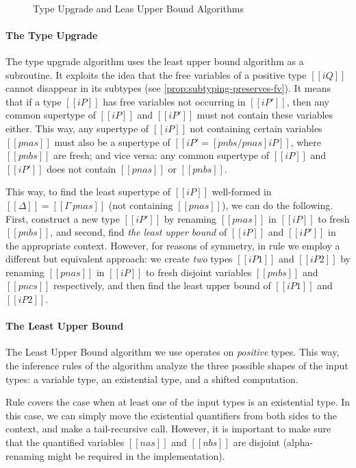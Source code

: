\begin{figure}[t]
  \begin{multicols}{2}
    \ottdefnLUBUpLabeled{}
    \columnbreak\\
    \ottdefnLUBNsubLabeled{}
  \end{multicols}
  \caption{Type Upgrade and Leas Upper Bound Algorithms}
  \label{fig:type-upgrade}
\end{figure}

\paragraph*{The Type Upgrade}
The type upgrade algorithm uses the least upper bound algorithm as a subroutine.
It exploits the idea that the free variables of a positive type $[[iQ]]$
cannot disappear in its subtypes (see \cref{prop:subtyping-preserves-fv}). 
It means that if 
a type $[[iP]]$ has free variables not occurring 
in $[[iP']]$, then any common supertype of $[[iP]]$
and $[[iP']]$ must not contain these variables either.
This way, any supertype of $[[iP]]$
not containing certain variables $[[pnas]]$ must also be 
a supertype of $[[iP' = [pnbs/pnas]iP ]]$, where $[[pnbs]]$ are fresh;
and vice versa: any common supertype of $[[iP]]$ and $[[iP']]$
does not contain $[[pnas]]$ or $[[pnbs]]$.

This way, to find the least supertype of $[[iP]]$ well-formed in $[[Δ]] = [[Γ \ {pnas}]]$
(\ie not containing $[[pnas]]$), we can do the following.
First, construct a new type $[[iP']]$ by renaming $[[pnas]]$ in $[[iP]]$ to fresh $[[pnbs]]$,
and second, find \emph{the least upper bound} of $[[iP]]$ and $[[iP']]$ in the appropriate
context. However, for reasons of symmetry, in rule
 we employ a different but equivalent approach:
we create \emph{two} types $[[iP1]]$ and $[[iP2]]$ by renaming $[[pnas]]$ in $[[iP]]$
to fresh disjoint variables $[[pnbs]]$ and $[[pncs]]$ respectively, and then 
find the least upper bound of $[[iP1]]$ and $[[iP2]]$.

\paragraph*{The Least Upper Bound}
The Least Upper Bound algorithm we use operates on \emph{positive}
types. This way, the inference rules of the algorithm
analyze the three possible shapes of the input types:
a variable type, an existential type, and a shifted computation.

 Rule  covers the case when 
 at least one of the input types is an existential type.
 In this case, we can simply move the existential quantifiers
 from both sides to the context, and make a tail-recursive call.
 However, it is important to make sure that 
 the quantified variables $[[nas]]$ and $[[nbs]]$ are disjoint
 (\ie alpha-renaming might be required in the implementation).
  
